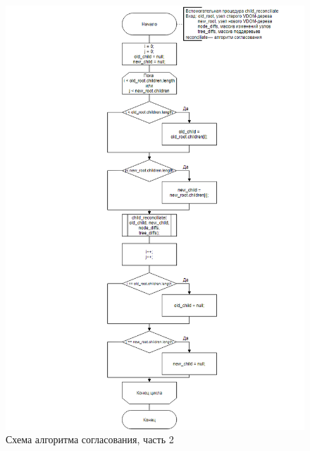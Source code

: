 \begin{figure}[h]
	\centering
	\includegraphics[width=170mm]{img/child-reconciliation-algorithm.png}
	\caption{Схема алгоритма согласования, часть 2}
	\label{fig:child-reconciliation-algorithm}
\end{figure}

